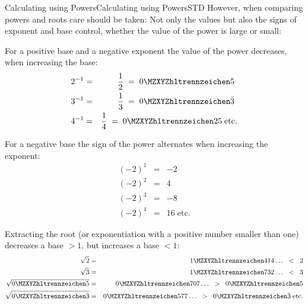 \begin{MXContent}{Calculating using Powers}{Calculating using Powers}{STD}
However, when comparing powers and roots care should be taken: Not only the values but also the signs of exponent and base
control, whether the value of the power is large or small:

\begin{MExample}
For a positive base and a negative exponent 
the value of the power decreases, when increasing the base:
\begin{eqnarray*}
2^{-1} &=& \frac12\;=\; \MZahl{0}{5}\ \\
3^{-1} &=& \frac13\;=\; \MZahl{0}{}\bar 3\ \\
4^{-1} &=& \frac14\;=\; \MZahl{0}{25}\; \text{etc.}
\end{eqnarray*}

For a negative base the sign of the power alternates when increasing the exponent:
\begin{eqnarray*}
(-2)^1 &=& -2\\
(-2)^2 &=& 4\\
(-2)^3 &=& -8\\
(-2)^4 &=& 16 \; \text{etc.}
\end{eqnarray*}

Extracting the root (or exponentiation with a positive number smaller than one) decreases 
a base $>1$, but increases a base $<1$:
\begin{eqnarray*}
\sqrt{2} &=& \MZahl{1}{414}\ldots\;\; < \;\; 2\\
\sqrt{3} &=& \MZahl{1}{732}\ldots\;\; < \;\; 3\\
\sqrt{\MZahl{0}{5}} &=& \MZahl{0}{707}\ldots\;\; > \;\; \MZahl{0}{5}\\
\sqrt{\MZahl{0}{}\bar 3} &=& \MZahl{0}{577}\ldots\;\; > \;\; \MZahl{0}{}\bar 3\;\text{etc.}
\end{eqnarray*}

\end{MExample}


\end{MXContent}
